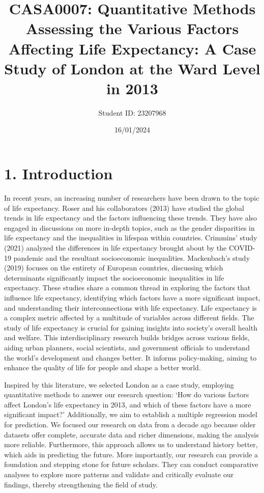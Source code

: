 \documentclass[a4paper,12pt]{article}
\title{CASA0007: Quantitative Methods\\ Assessing the Various Factors Affecting Life Expectancy: A Case Study of London at the Ward Level in 2013}
\author{Student ID: 23207968}
\date{16/01/2024}
\begin{document}
\maketitle

\section*{1. Introduction}
In recent years, an increasing number of researchers have been drawn to the topic of life expectancy. Roser and his collaborators (2013) have studied the global trends in life expectancy and the factors influencing these trends.  They have also engaged in discussions on more in-depth topics, such as the gender disparities in life expectancy and the inequalities in lifespan within countries. Crimmins' study (2021) analyzed the differences in life expectancy brought about by the COVID-19 pandemic and the resultant socioeconomic inequalities. Mackenbach's study (2019) focuses on the entirety of European countries, discussing which determinants significantly impact the socioeconomic inequalities in life expectancy. These studies share a common thread in exploring the factors that influence life expectancy, identifying which factors have a more significant impact, and understanding their interconnections with life expectancy. Life expectancy is a complex metric affected by a multitude of variables across different fields. The study of life expectancy is crucial for gaining insights into society's overall health and welfare. This interdisciplinary research builds bridges across various fields, aiding urban planners, social scientists, and government officials to understand the world's development and changes better. It informs policy-making, aiming to enhance the quality of life for people and shape a better world.

Inspired by this literature, we selected London as a case study, employing quantitative methods to answer our research question: `How do various factors affect London's life expectancy in 2013, and which of these factors have a more significant impact?' Additionally, we aim to establish a multiple regression model for prediction. We focused our research on data from a decade ago because older datasets offer complete, accurate data and richer dimensions, making the analysis more reliable. Furthermore, this approach allows us to understand history better, which aids in predicting the future. More importantly, our research can provide a foundation and stepping stone for future scholars. They can conduct comparative analyses to explore more patterns and validate and critically evaluate our findings, thereby strengthening the field of study.
\end{document}
